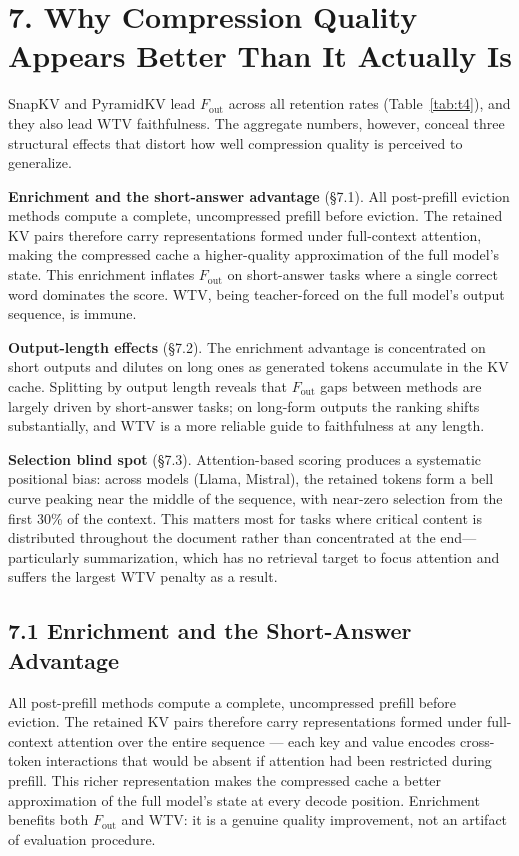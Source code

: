 \documentclass[10pt,letterpaper]{article}
\begin{document}
\hypertarget{why-compression-quality-appears-better}{%
\section{7. Why Compression Quality Appears Better Than It Actually Is}\label{why-compression-quality-appears-better}}

SnapKV and PyramidKV lead \(F_{\text{out}}\) across all retention rates
(Table~\ref{tab:t4}), and they also lead WTV faithfulness. The aggregate numbers,
however, conceal three structural effects that distort how well compression
quality is perceived to generalize.

\textbf{Enrichment and the short-answer advantage} (§7.1).  All post-prefill
eviction methods compute a complete, uncompressed prefill before eviction.
The retained KV pairs therefore carry representations formed under full-context
attention, making the compressed cache a higher-quality approximation of the
full model's state.  This enrichment inflates \(F_{\text{out}}\) on short-answer
tasks where a single correct word dominates the score.  WTV, being
teacher-forced on the full model's output sequence, is immune.

\textbf{Output-length effects} (§7.2).  The enrichment advantage
is concentrated on short outputs and dilutes on long ones as generated tokens
accumulate in the KV cache.  Splitting by output length reveals that
\(F_{\text{out}}\) gaps between methods are largely driven by short-answer
tasks; on long-form outputs the ranking shifts substantially, and WTV is a
more reliable guide to faithfulness at any length.

\textbf{Selection blind spot} (§7.3).  Attention-based
scoring produces a systematic positional bias: across models (Llama, Mistral),
the retained tokens form a bell curve peaking
near the middle of the sequence, with near-zero selection from the first 30\% of
the context.  This matters most for tasks where critical content is distributed
throughout the document rather than concentrated at the end---particularly
summarization, which has no retrieval target to focus attention and suffers the
largest WTV penalty as a result.

\hypertarget{first-token-advantage}{%
\subsection{7.1 Enrichment and the Short-Answer Advantage}\label{first-token-advantage}}

All post-prefill methods compute a complete, uncompressed prefill before
eviction. The retained KV pairs therefore carry representations formed
under full-context attention over the entire sequence --- each key and
value encodes cross-token interactions that would be absent if attention
had been restricted during prefill. This richer representation makes the
compressed cache a better approximation of the full model's state at every
decode position. Enrichment benefits both \(F_{\text{out}}\) and WTV: it
is a genuine quality improvement, not an artifact of evaluation procedure.
\end{document}
